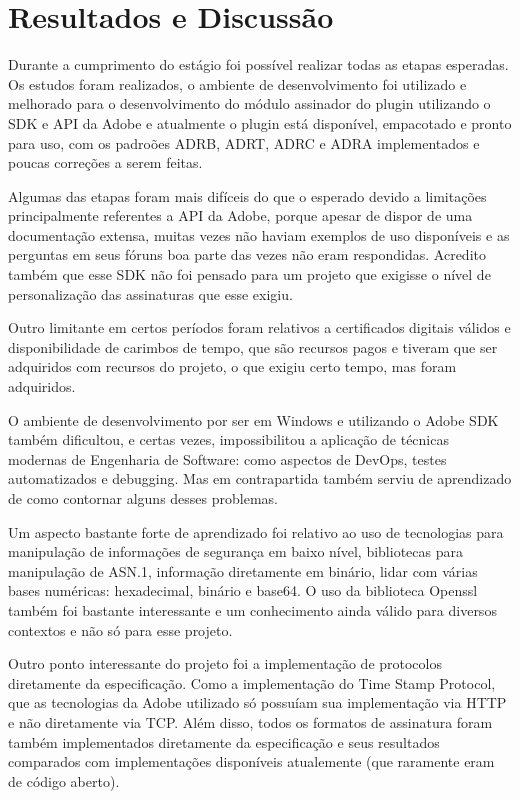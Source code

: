 \chapter[Resultados e Discussão]{Resultados e Discussão}


Durante a cumprimento do estágio foi possível realizar todas as etapas esperadas. Os estudos foram realizados, o ambiente de desenvolvimento foi
utilizado e melhorado para o desenvolvimento do módulo assinador do plugin utilizando o SDK e API da Adobe e atualmente o plugin está disponível,
empacotado e pronto para uso, com os padroões ADRB, ADRT, ADRC e ADRA implementados e poucas correções a serem feitas.

Algumas das etapas foram mais difíceis do que o esperado devido a limitações principalmente referentes a API da Adobe, porque apesar de dispor de uma
documentação extensa, muitas vezes não haviam exemplos de uso disponíveis e as perguntas em seus fóruns boa parte das vezes não eram respondidas.
Acredito também que esse SDK não foi pensado para um projeto que exigisse o nível de personalização das assinaturas que esse exigiu.

Outro limitante em certos períodos foram relativos a certificados digitais válidos e disponibilidade de carimbos de tempo, que são recursos pagos e
tiveram que ser adquiridos com recursos do projeto, o que exigiu certo tempo, mas foram adquiridos.

O ambiente de desenvolvimento por ser em Windows e utilizando o Adobe SDK também dificultou, e certas vezes, impossibilitou a aplicação de técnicas modernas
de Engenharia de Software: como aspectos de DevOps, testes automatizados e debugging. Mas em contrapartida também serviu de aprendizado de como contornar
alguns desses problemas.

Um aspecto bastante forte de aprendizado foi relativo ao uso de tecnologias para manipulação de informações de segurança em baixo nível, bibliotecas
para manipulação de ASN.1, informação diretamente em binário, lidar com várias bases numéricas: hexadecimal, binário e base64. O uso da biblioteca
Openssl também foi bastante interessante e um conhecimento ainda válido para diversos contextos e não só para esse projeto.

Outro ponto interessante do projeto foi a implementação de protocolos diretamente da especificação. Como a implementação do Time Stamp Protocol, que
as tecnologias da Adobe utilizado só possuíam sua implementação via HTTP e não diretamente via TCP. Além disso, todos os formatos de assinatura foram
também implementados diretamente da especificação e seus resultados comparados com implementações disponíveis atualemente (que raramente eram de código aberto).
